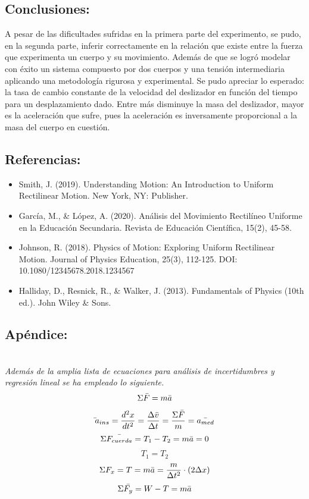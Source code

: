 \documentclass{article}
\begin{document}
\subsection{Conclusiones:}
A pesar de las dificultades sufridas en la primera parte del experimento, se pudo, en la segunda parte, inferir correctamente en la relación que existe entre la fuerza que experimenta un cuerpo y su movimiento. Además de que se logró modelar con éxito un sistema compuesto por dos cuerpos y una tensión intermediaria aplicando una metodología rigurosa y experimental. 
Se pudo apreciar lo esperado: la tasa de cambio constante de la velocidad del deslizador en función del tiempo para un desplazamiento dado. Entre más disminuye la masa del deslizador, mayor es la aceleración que sufre, pues la aceleración es inversamente proporcional a la masa del cuerpo en cuestión.

\subsection{Referencias:}
\begin{itemize}
    \item Smith, J. (2019). Understanding Motion: An Introduction to Uniform Rectilinear Motion. New York, NY: Publisher.
    \item García, M., \& López, A. (2020). Análisis del Movimiento Rectilíneo Uniforme en la Educación Secundaria. Revista de Educación Científica, 15(2), 45-58.
    \item Johnson, R. (2018). Physics of Motion: Exploring Uniform Rectilinear Motion. Journal of Physics Education, 25(3), 112-125. DOI: 10.1080/12345678.2018.1234567
    \item Halliday, D., Resnick, R., \& Walker, J. (2013). Fundamentals of Physics (10th ed.). John Wiley \& Sons.
\end{itemize}

\subsection{Apéndice:}\\
\textit{Además de la amplia lista de ecuaciones para análisis de incertidumbres y regresión lineal se ha empleado lo siguiente.}
\begin{equation*}
    \Sigma \Bar{F} = m\Bar{a}
\end{equation*}
\begin{equation*}
    \Bar{}{a_{ins}} = \frac{d^{2}x}{dt^{2}} = \frac{\Delta \Bar{v}}{\Delta t} = \frac{\Sigma\Bar{F}}{m} = \Bar{a_{med}}
\end{equation*}
\begin{equation*}
    \Sigma \Bar{F_{cuerda}} = T_{1} - T_{2} = m\Bar{a} = 0
\end{equation*}
\[T_{1} = T_{2}\]
\begin{equation*}
    \Sigma F_{x} = T = m\Bar{a} = \frac{m}{\Delta t^{2}} \cdot (2\Delta x)
\end{equation*}
\begin{equation*}
    \Sigma \Bar{F_{y}} = W - T = m\Bar{a}
\end{equation*}
\end{document}
